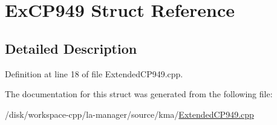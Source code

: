 \hypertarget{structExCP949}{
\section{ExCP949 Struct Reference}
\label{structExCP949}
}


\subsection{Detailed Description}


Definition at line 18 of file ExtendedCP949.cpp.

The documentation for this struct was generated from the following file:\begin{CompactItemize}
\item 
/disk/workspace-cpp/la-manager/source/kma/\hyperlink{ExtendedCP949_8cpp}{ExtendedCP949.cpp}\end{CompactItemize}
